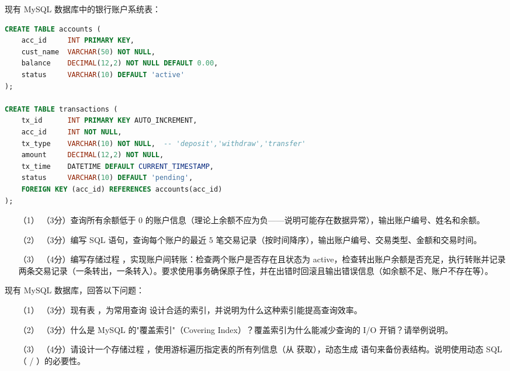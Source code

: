 \documentclass[a4paper,11pt]{article}
\begin{document}
\q 现有 MySQL 数据库中的银行账户系统表：
\begin{lstlisting}[language=SQL]
CREATE TABLE accounts (
    acc_id     INT PRIMARY KEY,
    cust_name  VARCHAR(50) NOT NULL,
    balance    DECIMAL(12,2) NOT NULL DEFAULT 0.00,
    status     VARCHAR(10) DEFAULT 'active'
);

CREATE TABLE transactions (
    tx_id      INT PRIMARY KEY AUTO_INCREMENT,
    acc_id     INT NOT NULL,
    tx_type    VARCHAR(10) NOT NULL,  -- 'deposit','withdraw','transfer'
    amount     DECIMAL(12,2) NOT NULL,
    tx_time    DATETIME DEFAULT CURRENT_TIMESTAMP,
    status     VARCHAR(10) DEFAULT 'pending',
    FOREIGN KEY (acc_id) REFERENCES accounts(acc_id)
);
\end{lstlisting}
\begin{enumerate}[leftmargin=2em, itemsep=3pt]
  \item[（1）] （3分）查询所有余额低于 0 的账户信息（理论上余额不应为负——说明可能存在数据异常），输出账户编号、姓名和余额。
  \item[（2）] （3分）编写 SQL 语句，查询每个账户的最近 5 笔交易记录（按时间降序），输出账户编号、交易类型、金额和交易时间。
  \item[（3）] （4分）编写存储过程 ，实现账户间转账：检查两个账户是否存在且状态为 active，检查转出账户余额是否充足，执行转账并记录两条交易记录（一条转出，一条转入）。要求使用事务确保原子性，并在出错时回滚且输出错误信息（如余额不足、账户不存在等）。
\end{enumerate}
\anslines{3.5cm}

\q 现有 MySQL 数据库，回答以下问题：
\begin{enumerate}[leftmargin=2em, itemsep=3pt]
  \item[（1）] （3分）现有表 ，为常用查询  设计合适的索引，并说明为什么这种索引能提高查询效率。
  \item[（2）] （3分）什么是 MySQL 的"覆盖索引"（Covering Index）？覆盖索引为什么能减少查询的 I/O 开销？请举例说明。
  \item[（3）] （4分）请设计一个存储过程 ，使用游标遍历指定表的所有列信息（从  获取），动态生成  语句来备份表结构。说明使用动态 SQL（ / ）的必要性。
\end{enumerate}
\anslines{3.5cm}
\end{document}
